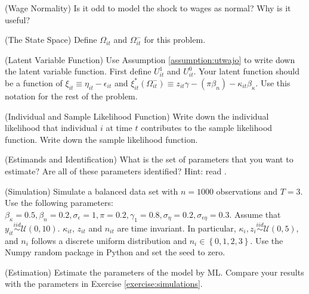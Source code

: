 \begin{exercise} (Wage Normality)
Is it odd to model the shock to wages as normal? Why is it useful?
\end{exercise}

\begin{exercise} (The State Space)
Define $\Omega_{it}$ and $\Omega_{it}^-$ for this problem. 
\end{exercise}

\begin{exercise} (Latent Variable Function)
Use Assumption \ref{assumption:utwajo} to write down the latent variable function. First define $U_{it}^1$ and $U_{it}^0$. Your latent function should be a function of $\xi_{it} \equiv \eta_{it} - \epsilon_{it}$ and  $\xi_{it}^*\left( \Omega_{it}^- \right) \equiv z_{it} \gamma - \left( \pi \beta_{n} \right) - \kappa_{it} \beta_{\kappa}$. Use this notation for the rest of the problem. 
\end{exercise}

\begin{exercise} (Individual and Sample Likelihood Function)
Write down the individual likelihood that individual $i$ at time $t$ contributes to the sample likelihood function. Write down the sample likelihood function.
\end{exercise}

\begin{exercise} (Estimands and Identification)
What is the set of parameters that you want to estimate? Are all of these parameters identified? Hint: read \citet{heckman1979sample}.
\end{exercise}

\begin{exercise} (Simulation) \label{exercise:simulations}
Simulate a balanced data set with $n = 1000$ observations and $T=3$. Use the following parameters: $\beta_\kappa = 0.5, \beta_n = 0.2, \sigma_\epsilon = 1, \pi = 0.2, \gamma_1 = 0.8, \sigma_\eta = 0.2, \sigma_{\epsilon \eta} = 0.3$. Assume that $y_{it} \overset{iid}{\sim} \mathcal{U} (0,10)$. $\kappa_{it}$, $z_{it}$ and $n_{it}$ are time invariant. In particular, $\kappa_{i}, z_{i} \overset{iid}{\sim} \mathcal{U} (0,5)$, and $n_{i}$ follows a discrete uniform distribution and $n_{i} \in \left\{0,1,2,3\right\}$. Use the Numpy random package in Python and set the seed to zero.
\end{exercise}

\begin{exercise} (Estimation)
Estimate the parameters of the model by ML. Compare your results with the parameters in Exercise \ref{exercise:simulations}.
\end{exercise}

